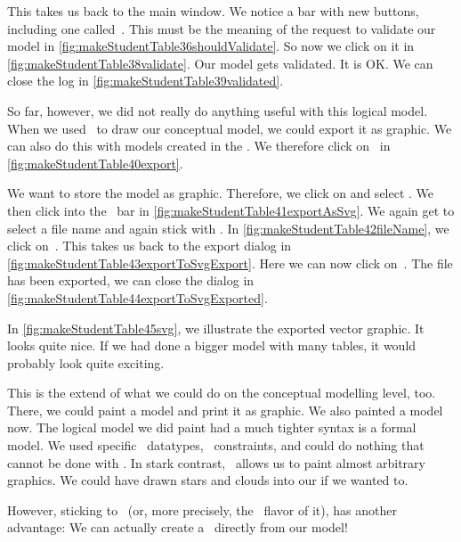 This takes us back to the main window.
We notice a bar with new buttons, including one called~.
This must be the meaning of the request to validate our model in \cref{fig:makeStudentTable36shouldValidate}.
So now we click on it in \cref{fig:makeStudentTable38validate}.
Our model gets validated.
It is OK.
We can close the log in \cref{fig:makeStudentTable39validated}.

So far, however, we did not really do anything useful with this logical model.
When we used \yEd\ to draw our conceptual model, we could export it as  graphic.
We can also do this with models created in the \pgmodeler.
We therefore click on~ in \cref{fig:makeStudentTable40export}.

We want to store the model as  graphic.
Therefore, we click on  and select .
We then click into the ~bar in \cref{fig:makeStudentTable41exportAsSvg}.
We again get to select a file name and again stick with .
In \cref{fig:makeStudentTable42fileName}, we click on~.
This takes us back to the export dialog in \cref{fig:makeStudentTable43exportToSvgExport}.
Here we can now click on~.
The file has been exported, we can close the dialog in \cref{fig:makeStudentTable44exportToSvgExported}.

In \cref{fig:makeStudentTable45svg}, we illustrate the exported vector graphic.
It looks quite nice.
If we had done a bigger model with many tables, it would probably look quite exciting.

This is the extend of what we could do on the conceptual modelling level, too.
There, we could paint a model and print it as graphic.
We also painted a model now.
The logical model we did paint had a much tighter syntax is a formal model.
We used specific \sql\ datatypes, \sql\ constraints, and could do nothing that cannot be done with \sql.
In stark contrast, \yEd\ allows us to paint almost arbitrary graphics.
We could have drawn stars and clouds into our  if we wanted to.

However, sticking to \sql~(or, more precisely, the \postgresql\ flavor of it), has another advantage:
We can actually create a \db\ directly from our model!

